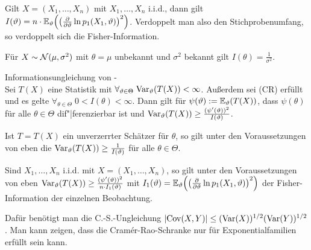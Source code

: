 \begin{Bem}
    Gilt $X = (X_1, \dotsc, X_n)$ mit $X_1, \dotsc, X_n$ i.i.d., dann gilt\\
    $I(\vartheta) = n \cdot \mathbb{E}_\vartheta\!\left(\left(\frac{\partial}{\partial \vartheta}
    \ln p_1(X_1, \vartheta)\right)^2\right)$.
    Verdoppelt man also den Stichprobenumfang, so verdoppelt sich die Fisher-Information.
\end{Bem}

\begin{Bsp}
    Für $X \sim \mathcal{N}(\mu, \sigma^2)$ mit $\theta = \mu$ unbekannt und $\sigma^2$ bekannt gilt
    $I(\theta) = \frac{1}{\sigma^2}$.
\end{Bsp}

\linie

\begin{Satz}{Informationsungleichung von -}\\
    Sei $T(X)$ eine Statistik mit $\forall_{\vartheta \in \Theta}\; \mathrm{Var}_\vartheta(T(X)) < \infty$.
    Außerdem sei (CR) erfüllt und es gelte $\forall_{\theta \in \Theta}\; 0 < I(\theta) < \infty$.
    Dann gilt für $\psi(\vartheta) := \mathbb{E}_\vartheta(T(X))$, dass
    $\psi(\theta)$ für alle $\theta \in \Theta$ dif"|ferenzierbar ist und
    $\mathrm{Var}_\vartheta(T(X)) \ge \frac{(\psi'(\vartheta))^2}{I(\vartheta)}$.
\end{Satz}

\begin{Kor}
    Ist $T = T(X)$ ein unverzerrter Schätzer für $\theta$, so gilt unter den Voraussetzungen
    von eben die 
    $\mathrm{Var}_\vartheta(T(X)) \ge \frac{1}{I(\vartheta)}$ für alle $\theta \in \Theta$.
\end{Kor}

\begin{Kor}
    Sind $X_1, \dotsc, X_n$ i.i.d. mit $X = (X_1, \dotsc, X_n)$, so gilt unter den Voraussetzungen
    von eben $\mathrm{Var}_\vartheta(T(X)) \ge \frac{(\psi'(\vartheta))^2}{n \cdot I_1(\vartheta)}$ mit
    $I_1(\vartheta) = \mathbb{E}_\vartheta\!\left(\left(\frac{\partial}{\partial \vartheta} \ln p_1(X_1, \vartheta)
    \right)^2\right)$ der Fisher-Information der einzelnen Beobachtung.
\end{Kor}

\begin{Bem}
    Dafür benötigt man die C.-S.-Ungleichung
    $|\mathrm{Cov}(X,Y)| \le (\mathrm{Var}(X))^{1/2} (\mathrm{Var}(Y))^{1/2}$.
    Man kann zeigen, dass die Cramér-Rao-Schranke nur für Exponentialfamilien erfüllt sein kann.
\end{Bem}

